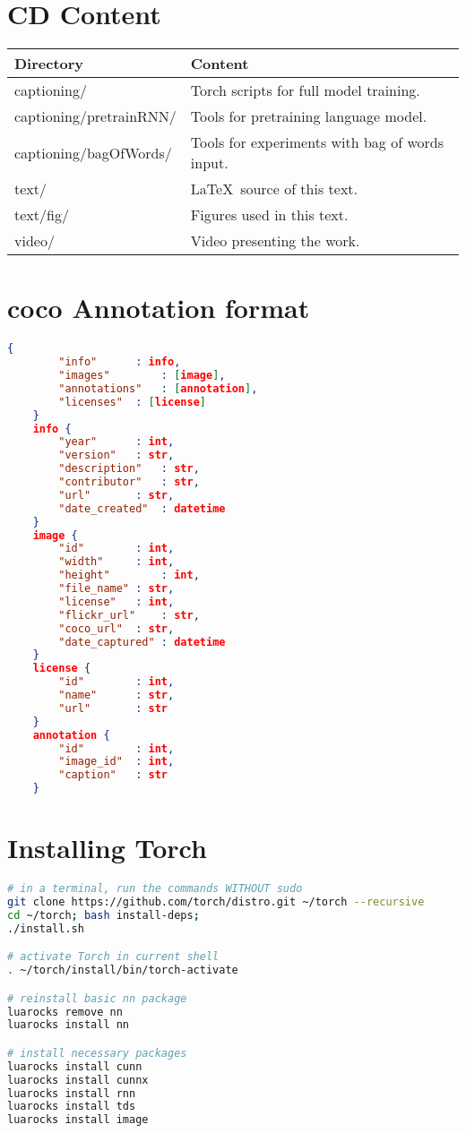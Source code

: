 \chapter{CD Content}

\begin{table}[h]
	\centering
	\renewcommand{\arraystretch}{1.2}
	\begin{tabular}{|l|l|}
		\hline
		Directory & Content  \\
		\hline
		\hline
		captioning/ & Torch scripts for full model training. \\
		captioning/pretrainRNN/ & Tools for pretraining language model. \\
		captioning/bagOfWords/ & Tools for experiments with bag of words input. \\
		text/ & \LaTeX\ source of this text. \\
		text/fig/ & Figures used in this text. \\
		video/ & Video presenting the work. \\
		\hline
	\end{tabular}
	\label{tab:cdcontent}
\end{table}

\chapter{\gls{coco} Annotation format} \label{chp:jsonAnnotation}
\begin{lstlisting}[language=json,firstnumber=1]
	{
		"info"		: info,
		"images"		: [image],
		"annotations"	: [annotation],
		"licenses"	: [license]
	}
	info {
		"year"		: int,
		"version"	: str,
		"description"	: str,
		"contributor"	: str,
		"url"		: str,
		"date_created"	: datetime
	}
	image {
		"id"		: int,
		"width"		: int,
		"height"		: int,
		"file_name"	: str,
		"license"	: int,
		"flickr_url"	: str,
		"coco_url"	: str,
		"date_captured"	: datetime
	}
	license {
		"id"		: int,
		"name"		: str,
		"url"		: str
	}
	annotation {
		"id"		: int,
		"image_id"	: int,
		"caption"	: str
	}
\end{lstlisting}

\chapter{Installing Torch}\label{chp:installation}

\begin{lstlisting}[firstnumber=1,breakindent=75pt, language=bash,frame=single]
# in a terminal, run the commands WITHOUT sudo
git clone https://github.com/torch/distro.git ~/torch --recursive
cd ~/torch; bash install-deps;
./install.sh

# activate Torch in current shell
. ~/torch/install/bin/torch-activate

# reinstall basic nn package
luarocks remove nn
luarocks install nn

# install necessary packages
luarocks install cunn
luarocks install cunnx
luarocks install rnn
luarocks install tds
luarocks install image

\end{lstlisting}

